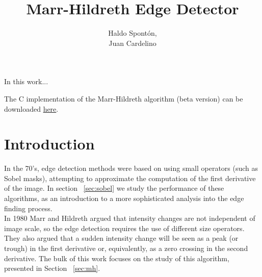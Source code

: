 \documentclass{ipol}
\begin{document}
\title{Marr-Hildreth Edge Detector}
\author{Haldo Spont\'on,\\
        Juan Cardelino}
\date{}
\ipolMaketitle

\begin{ipolAbstract}
In this work...
\end{ipolAbstract}

\begin{ipolCode}
The C implementation of the Marr-Hildreth algorithm (beta version) can be
downloaded \href{http://iie.fing.edu.uy/~haldos/ipol/marr-hildreth.tar.gz}{here}.
\end{ipolCode}


\section{Introduction}
\label{sec:intro}

In the 70's, edge detection methods were based on using small operators 
(such as Sobel masks), attempting to approximate the computation of the
first derivative of the image. In section ~\ref{sec:sobel} we study the 
performance of these algorithms, as an introduction to a more sophisticated 
analysis into the edge finding process.\\

In 1980 Marr and Hildreth argued that intensity changes are not independent 
of image scale, so the edge detection requires the use of different size 
operators. They also argued that a sudden intensity change will be seen 
as a peak (or trough) in the first derivative or, equivalently, as a zero 
crossing in the second derivative. The bulk of this work focuses on the 
study of this algorithm, presented in Section ~\ref{sec:mh}.\\
\end{document}
